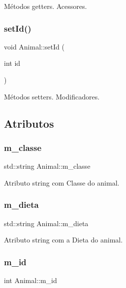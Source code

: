 Métodos getters. Acessores. \mbox{\label{classAnimal_af5a262e8a6e04632a48307101494925c}} 
\subsubsection{\texorpdfstring{set\+Id()}{setId()}}
{\footnotesize\ttfamily void Animal\+::set\+Id (\begin{DoxyParamCaption}\item[{int}]{id }\end{DoxyParamCaption})}

Métodos setters. Modificadores. 

\subsection{Atributos}
\mbox{\label{classAnimal_a8a4d049b481ab0fe88015cde7557d281}} 
\subsubsection{\texorpdfstring{m\+\_\+classe}{m\_classe}}
{\footnotesize\ttfamily std\+::string Animal\+::m\+\_\+classe\hspace{0.3cm}{\ttfamily [protected]}}

Atributo string com Classe do animal. \mbox{\label{classAnimal_af7ea074464d9a468f7412a2165afd553}} 
\subsubsection{\texorpdfstring{m\+\_\+dieta}{m\_dieta}}
{\footnotesize\ttfamily std\+::string Animal\+::m\+\_\+dieta\hspace{0.3cm}{\ttfamily [protected]}}

Atributo string com a Dieta do animal. \mbox{\label{classAnimal_a1a39448480e098fc74b5b67c4921a5ec}} 
\subsubsection{\texorpdfstring{m\+\_\+id}{m\_id}}
{\footnotesize\ttfamily int Animal\+::m\+\_\+id\hspace{0.3cm}{\ttfamily [protected]}}

